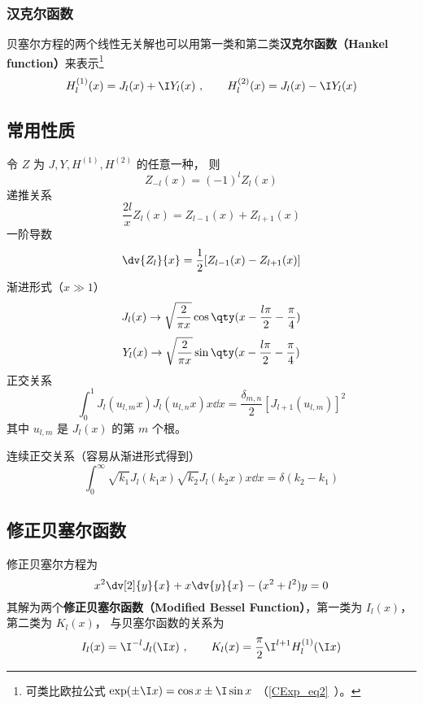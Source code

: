 \subsubsection{汉克尔函数}
贝塞尔方程的两个线性无关解也可以用第一类和第二类\textbf{汉克尔函数（Hankel function）}来表示\footnote{可类比欧拉公式 $\exp(\pm\I x) = \cos x \pm \I\sin x$ （\autoref{CExp_eq2}~）。}
\begin{equation}
H_l ^{(1)}(x) = J_l(x) + \I Y_l(x)~,
\qquad
H_l ^{(2)}(x) = J_l(x) - \I Y_l(x)
\end{equation}

\subsection{常用性质}
令 $Z$ 为 $J, Y, H^{(1)}, H^{(2)}$ 的任意一种， 则
\begin{equation}
Z_{-l}(x) = (-1)^l Z_l(x)
\end{equation}
递推关系
\begin{equation}
\frac{2l}{x} Z_l(x) = Z_{l -1}(x) + Z_{l+1}(x)
\end{equation}
一阶导数
\begin{equation}
\dv{Z_l}{x} = \frac12 [Z_{l  - 1}(x) - Z_{l +1}(x)]
\end{equation}
渐进形式（$x \gg 1$）
\begin{equation}
J_l(x) \to \sqrt{\frac{2}{\pi x}} \cos\qty(x - \frac{l\pi}{2} - \frac{\pi}{4})
\end{equation}
\begin{equation}
Y_l(x) \to \sqrt{\frac{2}{\pi x}} \sin\qty(x - \frac{l\pi}{2} - \frac{\pi}{4})
\end{equation}
正交关系
\begin{equation}
\int_0^1 J_l (u_{l ,m} x) J_l (u_{l ,n} x) x \dd{x} = \frac{\delta_{m,n}}{2}[J_{l + 1} (u_{l ,m})]^2
\end{equation}
其中 $u_{l, m}$ 是 $J_l(x)$ 的第 $m$ 个根。

连续正交关系（容易从渐进形式得到）
\begin{equation}
\int_0^\infty \sqrt{k_1} J_l (k_1 x) \sqrt{k_2}J_l (k_2 x) x \dd{x} = \delta(k_2 - k_1)
\end{equation}

\subsection{修正贝塞尔函数}
修正贝塞尔方程为
\begin{equation}
x^2 \dv[2]{y}{x} + x \dv{y}{x} - (x^2 + l ^2)y = 0
\end{equation}
其解为两个\textbf{修正贝塞尔函数（Modified Bessel Function）}，第一类为 $I_l(x)$，  第二类为 $K_l(x)$，  与贝塞尔函数的关系为
\begin{equation}\label{Bessel_eq2}
I_l(x) = \I^{-l} J_l(\I x)~,
\qquad
K_l(x) = \frac{\pi}{2} \I^{l  + 1} H_l ^{(1)}(\I x)
\end{equation}
